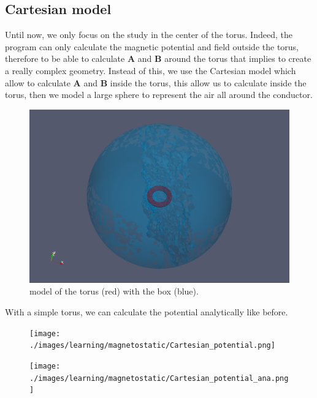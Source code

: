 \documentclass[11pt]{amsart}
\begin{document}
\hypertarget{x-cartesian-model}{\subsection{Cartesian model}}
Until now, we only focus on the study in the center of the torus.
Indeed, the program can only calculate the magnetic potential and field outside the torus,
therefore to be able to calculate \textbf{A} and \textbf{B} around the torus that implies to create a really complex geometry.
Instead of this, we use the Cartesian model which allow to calculate \textbf{A} and \textbf{B} inside the torus,
this allow us to calculate inside the torus, then we model a large sphere to represent the air all around the conductor.


\begin{figure}[h]{}
\centering\includegraphics[width=7.0truein]{./images/learning/magnetostatic/Cartesian_model.png}
\caption{model of the torus (red) with the box (blue).}
\centering
\end{figure}

With a simple torus, we can calculate the potential analytically like before.


\begin{figure}
\centering\texttt{[image: ./images/learning/magnetostatic/Cartesian\_potential.png]}


\end{figure}

\begin{figure}
\centering\texttt{[image: ./images/learning/magnetostatic/Cartesian\_potential\_ana.png]}


\end{figure}
\end{document}
